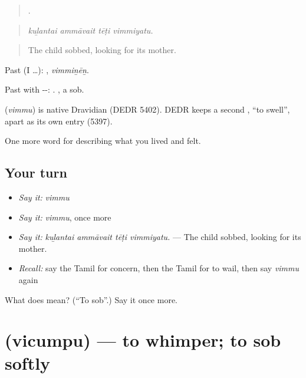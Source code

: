 \begin{quote}
   .
\end{quote}

\begin{quote}
\emph{kuḻantai ammāvait tēṭi vimmiyatu.}
\end{quote}

\begin{quote}
The child sobbed, looking for its mother.
\end{quote}

Past (I …): , \emph{vimmiṉēṉ}.

Past with --: . , a sob.

\begin{cousinweb}
\textbf{} (\emph{vimmu}) is native Dravidian (DEDR 5402). DEDR keeps a second , \textquotedblleft{}to swell\textquotedblright{}, apart as its own entry (5397).
\end{cousinweb}

\begin{grammarlens}[title={What you've built}]
One more word for describing what you lived and felt.
\end{grammarlens}

\subsection*{Your turn}
\begin{itemize}
\raggedright
  \item \emph{Say it:} \emph{vimmu}
  \item \emph{Say it:} \emph{vimmu}, once more
  \item \emph{Say it:} \emph{kuḻantai ammāvait tēṭi vimmiyatu.} — The child sobbed, looking for its mother.
  \item \emph{Recall:} say the Tamil for concern, then the Tamil for to wail, then say \emph{vimmu} again
\end{itemize}

\begin{tcolorbox}[breakable,colback=teal!4,colframe=teal!35!black,title={Before you move on}]
What does  mean? (\textquotedblleft{}To sob\textquotedblright{}.) Say it once more.
\end{tcolorbox}
\section[\texorpdfstring{\ta{விசும்பு} (vicumpu)}{விசும்பு (vicumpu)}]{ (vicumpu) — to whimper; to sob softly}

